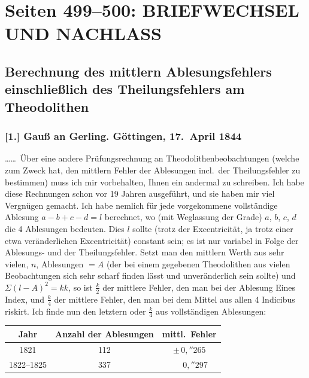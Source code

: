 \documentclass[12pt,a4paper]{article}
\theoremstyle{plain}
\theoremstyle{definition}
\theoremstyle{remark}
\begin{document}
\vfill
\eject

\section*{Seiten 499--500: BRIEFWECHSEL UND NACHLASS}
\label{sec:briefwechsel_nachlass}

\subsection*{Berechnung des mittlern Ablesungsfehlers einschlie\ss lich des Theilungsfehlers am Theodolithen}

\subsubsection*{[1.] Gau\ss{} an Gerling. G\"ottingen, 17.\ April 1844}

\ldots\ldots\ \"Uber eine andere Pr\"ufungsrechnung an Theodolithenbeobachtungen (welche zum Zweck hat, den mittlern Fehler der Ablesungen incl.\ der Theilungsfehler zu bestimmen) muss ich mir vorbehalten, Ihnen ein andermal zu schreiben. Ich habe diese Rechnungen schon vor 19 Jahren ausgef\"uhrt, und sie haben mir viel Vergn\"ugen gemacht. Ich habe nemlich f\"ur jede vorgekommene vollst\"andige Ablesung $a - b + c - d = l$ berechnet, wo (mit Weglassung der Grade) $a$, $b$, $c$, $d$ die 4 Ablesungen bedeuten. Dies $l$ sollte (trotz der Excentricit\"at, ja trotz einer etwa ver\"anderlichen Excentricit\"at) constant sein; es ist nur variabel in Folge der Ablesungs- und der Theilungsfehler. Setzt man den mittlern Werth aus sehr vielen, $n$, Ablesungen $= A$ (der bei einem gegebenen Theodolithen aus vielen Beobachtungen sich sehr scharf finden l\"asst und unver\"anderlich sein sollte) und $\Sigma(l-A)^2 = kk$, so ist $\tfrac{k}{2}$ der mittlere Fehler, den man bei der Ablesung Eines Index, und $\tfrac{k}{4}$ der mittlere Fehler, den man bei dem Mittel aus allen 4 Indicibus riskirt. Ich finde nun den letztern oder $\tfrac{k}{4}$ aus vollst\"andigen Ablesungen:

\medskip
\begin{center}
\begin{tabular}{c|c|c}
\hline
Jahr & Anzahl der Ablesungen & mittl.\ Fehler \\
\hline
1821 & 112 & $\pm\,0{,}\!''\!265$ \\
1822--1825 & 337 & $\phantom{\pm}\,0{,}\!''\!297$ \\
\hline
\end{tabular}
\end{center}
\medskip
\end{document}
